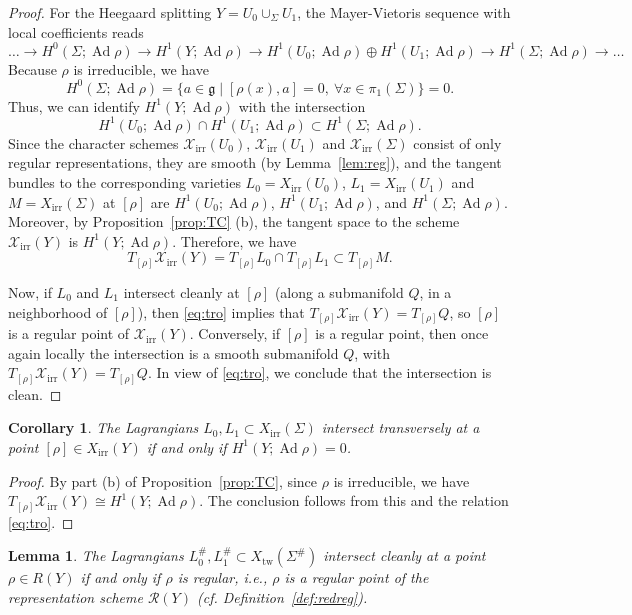 \documentclass [11pt]{amsart}
\newtheorem {lemma}[theorem]{Lemma}
\newtheorem {corollary}[theorem]{Corollary}
\theoremstyle{remark}
\def\g{\mathfrak{g}}
\def\Rep {R}
\def\Rs {\mathscr{R}}
\def\Ad {\operatorname{Ad}}
\def\Char {X}
\def\CharIrr {\Char_{\operatorname{irr}}}
\def\CharsIrr {\mathscr{X}_{\operatorname{irr}}}
\def\Xtw{\Char_{\operatorname{tw}}}
\begin{document}
\begin{proof}
For the Heegaard splitting $Y = U_0 \cup_{\Sigma} U_1$, the Mayer-Vietoris sequence with local coefficients reads
$$ \dots \to H^0(\Sigma; \Ad\rho) \to H^1(Y; \Ad \rho) \to H^1(U_0; \Ad \rho) \oplus H^1(U_1; \Ad \rho) \to H^1(\Sigma; \Ad \rho) \to \dots$$
Because $\rho$ is irreducible, we have 
$$H^0(\Sigma; \Ad\rho)=\{a \in \g \mid [\rho(x), a]=0,\ \forall x \in \pi_1(\Sigma)\}=0.$$
Thus, we can identify $H^1(Y; \Ad \rho) $ with the intersection
$$ H^1(U_0; \Ad \rho) \cap H^1(U_1; \Ad \rho) \subset H^1(\Sigma; \Ad \rho).$$
Since the character schemes $\CharsIrr(U_0)$, $\CharsIrr(U_1)$ and $\CharsIrr(\Sigma)$ consist of only regular representations, they are smooth (by Lemma~\ref{lem:reg}), and the tangent bundles to the corresponding varieties $L_0 = \CharIrr(U_0)$, $L_1=\CharIrr(U_1)$ and $M=\CharIrr(\Sigma)$ at $[\rho]$ are $H^1(U_0; \Ad \rho)$, $H^1(U_1; \Ad \rho)$, and $H^1(\Sigma; \Ad \rho)$. Moreover, by Proposition~\ref{prop:TC} (b), the tangent space to the scheme $\CharsIrr(Y)$ is $H^1(Y; \Ad \rho)$.
Therefore, we have 
\begin{equation}
\label{eq:tro}
T_{[\rho]} \CharsIrr(Y)= T_{[\rho]}L_0 \cap T_{[\rho]}L_1 \subset T_{[\rho]}M.
\end{equation}

Now, if $L_0$ and $L_1$ intersect cleanly at $[\rho]$ (along a submanifold $Q$, in a neighborhood of $[\rho]$), then \eqref{eq:tro} implies that $T_{[\rho]} \CharsIrr(Y)= T_{[\rho]}Q$, so $[\rho]$ is a regular point of $\CharsIrr(Y)$. Conversely, if $[\rho]$ is a regular point, then once again locally the intersection is a smooth submanifold $Q$, with $T_{[\rho]} \CharsIrr(Y)= T_{[\rho]}Q$. In view of \eqref{eq:tro}, we conclude that the intersection is clean.
\end{proof}

\begin{corollary}
\label{cor:transChar}
The Lagrangians $L_0, L_1 \subset \CharIrr(\Sigma)$ intersect transversely at a point $[\rho] \in \CharIrr(Y)$ if and only if $H^1(Y; \Ad \rho) = 0$.
\end{corollary}

\begin{proof}
By part (b) of Proposition~\ref{prop:TC}, since $\rho$ is irreducible, we have $T_{[\rho]} \CharsIrr(Y) \cong H^1(Y; \Ad \rho)$. The conclusion follows from this and the relation \eqref{eq:tro}.
\end{proof}


\begin{lemma}
\label{lem:cleanRep}
The Lagrangians $L^{\#}_0, L^{\#}_1 \subset \Xtw(\Sigma^{\#})$ intersect cleanly at a point $\rho \in \Rep(Y)$ if and only if $\rho$ is regular, i.e., $\rho$ is a regular point of the representation scheme $\Rs(Y)$ (cf. Definition~\ref{def:redreg}).
\end{lemma}
\end{document}
